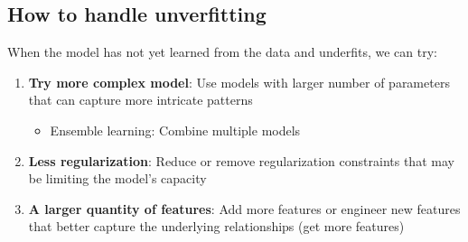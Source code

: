 \documentclass[a4paper]{article}
\theoremstyle{definition}
\begin{document}
\subsection{How to handle unverfitting}
When the model has not yet learned from the data and underfits, we can try:
\begin{enumerate}
    \item \textbf{Try more complex model}: Use models with larger number of parameters that can capture more intricate patterns 
    \begin{itemize}
        \item Ensemble learning: Combine multiple models 
    \end{itemize}
    \item \textbf{Less regularization}: Reduce or remove regularization constraints that may be limiting the model's capacity 
    \item \textbf{A larger quantity of features}: Add more features or engineer new features that better capture the underlying relationships (get more features)
\end{enumerate}
\end{document}
